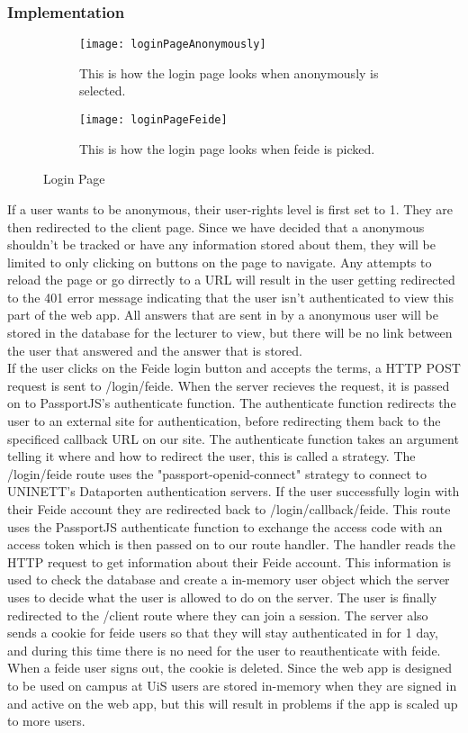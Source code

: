 \subsubsection{Implementation}
\begin{figure}[h]
    \centering
    \begin{subfigure}{0.45\linewidth}
        \texttt{[image: loginPageAnonymously]}
        \caption{This is how the login page looks when anonymously is selected.}
        \label{fig:loginPageAnonoumsly}
    \end{subfigure}
    \begin{subfigure}{0.45\linewidth}
        \texttt{[image: loginPageFeide]}
        \caption{This is how the login page looks when feide is picked.}
        \label{fig:loginPageFeide}
    \end{subfigure}
    \caption{Login Page}
    \label{fig:loginPage}
\end{figure}
\noindent
If a user wants to be anonymous, their user-rights level is first set to 1. They are then redirected to the client page. Since we have decided that a anonymous shouldn't be tracked or have any information stored about them, they will be limited to only clicking on buttons on the page to navigate. Any attempts to reload the page or go dirrectly to a URL will result in the user getting redirected to the 401 error message indicating that the user isn't authenticated to view this part of the web app. All answers that are sent in by a anonymous user will be stored in the database for the lecturer to view, but there will be no link between the user that answered and the answer that is stored.
\\[11pt]
If the user clicks on the Feide login button and accepts the terms, a HTTP POST request is sent to /login/feide. When the server recieves the request, it is passed on to PassportJS's authenticate function. The authenticate function redirects the user to an external site for authentication, before redirecting them back to the specificed callback URL on our site. The authenticate function takes an argument telling it where and how to redirect the user, this is called a strategy. The /login/feide route uses the "passport-openid-connect" strategy to connect to UNINETT's Dataporten authentication servers. If the user successfully login with their Feide account they are redirected back to /login/callback/feide. This route uses the PassportJS authenticate function to exchange the access code with an access token which is then passed on to our route handler. The handler reads the HTTP request to get information about their Feide account. This information is used to check the database and create a in-memory user object which the server uses to decide what the user is allowed to do on the server. The user is finally redirected to the /client route where they can join a session. The server also sends a cookie for feide users so that they will stay authenticated in for 1 day, and during this time there is no need for the user to reauthenticate with feide. When a feide user signs out, the cookie is deleted. Since the web app is designed to be used on campus at UiS users are stored in-memory when they are signed in and active on the web app, but this will result in problems if the app is scaled up to more users.